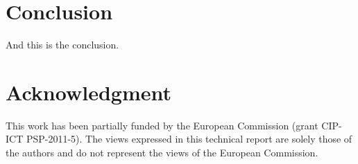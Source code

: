 \documentclass[draftclsnofoot,12pt,journal,onecolumn]{IEEEtran}
\begin{document}
\section{Conclusion}
\label{sec:conclusion}
And this is the conclusion.





%





\section*{Acknowledgment}

This work has been partially funded by the European Commission (grant CIP-ICT PSP-2011-5).
The views expressed in this technical report are solely those of the authors and do not represent the views of the European Commission.
\end{document}
